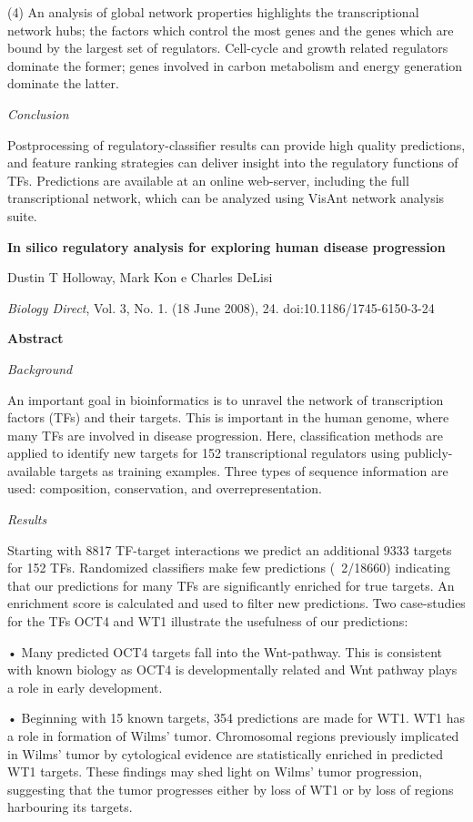(4) An analysis of global network properties highlights the transcriptional network hubs; the factors which control the most genes and the genes which are bound by the largest set of regulators. Cell-cycle and growth related regulators dominate the former; genes involved in carbon metabolism and energy generation dominate the latter.

{\it Conclusion}

Postprocessing of regulatory-classifier results can provide high quality predictions, and feature ranking strategies can deliver insight into the regulatory functions of TFs. Predictions are available at an online web-server, including the full transcriptional network, which can be analyzed using VisAnt network analysis suite.


{\Large \bf In silico regulatory analysis for exploring human disease progression}

Dustin T Holloway, Mark Kon e Charles DeLisi

{\it Biology Direct}, Vol. 3, No. 1. (18 June 2008), 24. doi:10.1186/1745-6150-3-24

{\large \bf Abstract}
 
{\it Background}

An important goal in bioinformatics is to unravel the network of transcription factors (TFs) and their targets. This is important in the human genome, where many TFs are involved in disease progression. Here, classification methods are applied to identify new targets for 152 transcriptional regulators using publicly-available targets as training examples. Three types of sequence information are used: composition, conservation, and overrepresentation.

{\it Results}

Starting with 8817 TF-target interactions we predict an additional 9333 targets for 152 TFs. Randomized classifiers make few predictions (~2/18660) indicating that our predictions for many TFs are significantly enriched for true targets. An enrichment score is calculated and used to filter new predictions.
Two case-studies for the TFs OCT4 and WT1 illustrate the usefulness of our predictions:

• Many predicted OCT4 targets fall into the Wnt-pathway. This is consistent with known biology as OCT4 is developmentally related and Wnt pathway plays a role in early development.

• Beginning with 15 known targets, 354 predictions are made for WT1. WT1 has a role in formation of Wilms' tumor. Chromosomal regions previously implicated in Wilms' tumor by cytological evidence are statistically enriched in predicted WT1 targets. These findings may shed light on Wilms' tumor progression, suggesting that the tumor progresses either by loss of WT1 or by loss of regions harbouring its targets.

